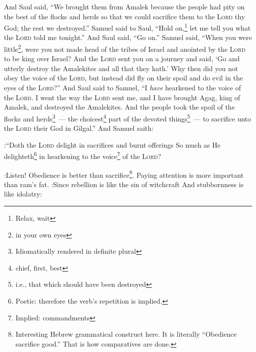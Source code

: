 \begin{enumerate}
     And Saul said, ``We brought them from Amalek because the people had pity on the best of the flocks and herds so that we could sacrifice them to the \textsc{Lord} thy God; the rest we destroyed.''%
     Samuel said to Saul, ``Hold on,\footnote{Relax, wait} let me tell you what the \textsc{Lord} told me tonight.'' And Saul said, ``Go on.''%
     Samuel said, ``When you were little\footnote{in your own eyes}, were you not made head of the tribes of Israel and anointed by the \textsc{Lord} to be king over Israel?%
     And the \textsc{Lord} sent you on a journey and said, `Go and utterly destroy the Amalekites and all that they hath.'%
     Why then did you not obey the voice of the \textsc{Lord}, but instead did fly on their spoil and do evil in the eyes of the \textsc{Lord}?''%
     And Saul said to Samuel, ``I \emph{have} hearkened to the voice of the \textsc{Lord}. I went the way the \textsc{Lord} sent me, and I have brought Agag, king of Amalek, and destroyed the Amalekites.%
     And the people took the spoil of the flocks and herds\footnote{Idiomatically rendered in definite plural}~--- the choicest\footnote{chief, first, best} part of the devoted things\footnote{i.e., that which should have been destroyed}~--- to sacrifice unto the \textsc{Lord} their God in Gilgal.''%
     And Samuel saith:
    
:``Doth the \textsc{Lord} delight in sacrifices and burnt offerings So much as He delighteth\footnote{Poetic: therefore the verb's repetition is implied.} in hearkening to the voice\footnote{Implied: commandments} of the \textsc{Lord}?

:Listen! Obedience is better than sacrifice\footnote{Interesting Hebrew grammatical construct here. It is literally ``Obedience sacrifice good.'' That is how comparatives are done.}. Paying attention is more important than ram's fat.%
     :Since rebellion is like the sin of witchcraft And stubbornness is like idolatry:


\end{enumerate}
